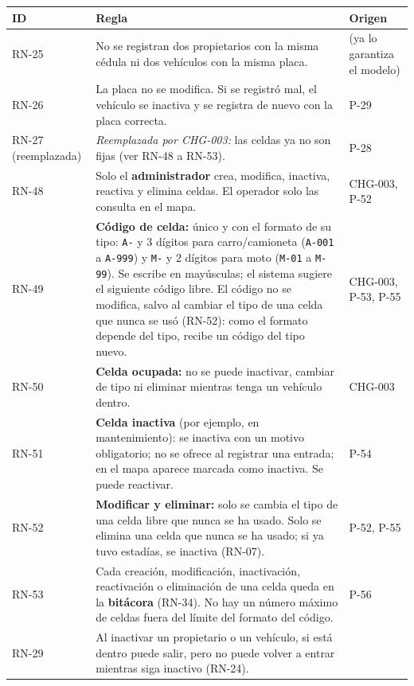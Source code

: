 \begin{longtable}{>{\raggedright\arraybackslash}p{2.6cm}>{\raggedright\arraybackslash}p{10.0cm}>{\raggedright\arraybackslash}p{1.8cm}}
\toprule
\textbf{ID} & \textbf{Regla} & \textbf{Origen}\\
\midrule\endhead
RN-25 & No se registran dos propietarios con la misma cédula ni dos vehículos con la misma placa. & [I] (ya lo garantiza el modelo)\\
RN-26 & La placa no se modifica. Si se registró mal, el vehículo se inactiva y se registra de nuevo con la placa correcta. & [U] P-29\\
RN-27 (reemplazada) & \emph{Reemplazada por CHG-003:} las celdas ya no son fijas (ver RN-48 a RN-53). & [U] P-28\\
RN-48 & Solo el \textbf{administrador} crea, modifica, inactiva, reactiva y elimina celdas. El operador solo las consulta en el mapa. & [E] CHG-003, P-52\\
RN-49 & \textbf{Código de celda:} único y con el formato de su tipo: \texttt{A-} y 3 dígitos para carro/camioneta (\texttt{A-001} a \texttt{A-999}) y \texttt{M-} y 2 dígitos para moto (\texttt{M-01} a \texttt{M-99}). Se escribe en mayúsculas; el sistema sugiere el siguiente código libre. El código no se modifica, salvo al cambiar el tipo de una celda que nunca se usó (RN-52): como el formato depende del tipo, recibe un código del tipo nuevo. & [E] CHG-003, P-53, P-55\\
RN-50 & \textbf{Celda ocupada:} no se puede inactivar, cambiar de tipo ni eliminar mientras tenga un vehículo dentro. & [E] CHG-003\\
RN-51 & \textbf{Celda inactiva} (por ejemplo, en mantenimiento): se inactiva con un motivo obligatorio; no se ofrece al registrar una entrada; en el mapa aparece marcada como inactiva. Se puede reactivar. & [U] P-54\\
RN-52 & \textbf{Modificar y eliminar:} solo se cambia el tipo de una celda libre que nunca se ha usado. Solo se elimina una celda que nunca se ha usado; si ya tuvo estadías, se inactiva (RN-07). & [U] P-52, P-55\\
RN-53 & Cada creación, modificación, inactivación, reactivación o eliminación de una celda queda en la \textbf{bitácora} (RN-34). No hay un número máximo de celdas fuera del límite del formato del código. & [U] P-56\\
RN-29 & Al inactivar un propietario o un vehículo, si está dentro puede salir, pero no puede volver a entrar mientras siga inactivo (RN-24). & [I]\\

\end{longtable}
